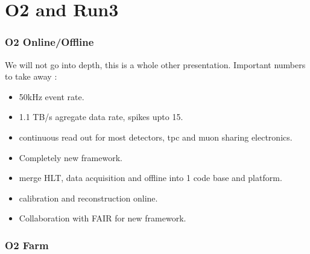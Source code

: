\documentclass{beamer}
\begin{document}
\section{O2 and Run3}
\begin{frame}
\frametitle{O2 Online/Offline}
We will not go into depth, this is a whole other presentation.
Important numbers to take away :
\begin{itemize}
  \item 50kHz event rate.
  \item 1.1 TB/s agregate data rate, spikes upto 15.
  \item continuous read out for most detectors, tpc and muon sharing electronics.
  \item Completely new framework.
  \item merge HLT, data acquisition and offline into 1 code base and platform.
  \item calibration and reconstruction online.
  \item Collaboration with FAIR for new framework.
\end{itemize}

\end{frame}
\begin{frame}
  \frametitle{O2 Farm}
\end{frame}
\end{document}
